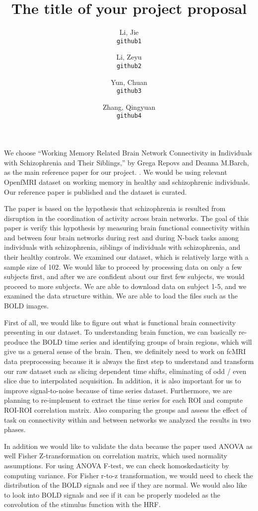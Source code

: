 \documentclass[11pt]{article}
\title{The title of your project proposal}
\author{
  Li, Jie\\
  \texttt{github1}
  \and
  Li, Zeyu\\
  \texttt{github2}
  \and
  Yun, Chuan\\
  \texttt{github3}
  \and
  Zhang, Qingyuan\\
  \texttt{github4}
}
\begin{document}
\maketitle

We choose ``Working Memory Related Brain Network Connectivity in Individuals
with Schizophrenia and Their Siblings,'' by Grega Repovs and Deanna M.Barch, as
the main reference paper for our project. \cite{lindquist2008statistical}. We
would be using relevant OpenfMRI dataset on working memory in healthy and
schizophrenic individuals. Our reference paper is published and the dataset is
curated.

The paper is based on the hypothesis that schizophrenia is resulted from
disruption in the coordination of activity across brain networks. The goal of
this paper is verify this hypothesis by measuring brain functional connectivity
within and between four brain networks during rest and during N-back tasks among
individuals with schizophrenia, siblings of individuals with schizophrenia, and
their healthy controls. We examined our dataset, which is relatively large with
a sample size of 102. We would like to proceed by processing data on only a few
subjects first, and after we are confident about our first few subjects, we
would proceed to more subjects. We are able to download data on subject 1-5, and
we examined the data structure within. We are able to load the files such as the
BOLD images. 
	
First of all, we would like to figure out what is functional brain connectivity
presenting in our dataset. To understanding brain function, we can basically
re-produce the BOLD time series and identifying groups of brain regions, which
will give us a general sense of the brain. Then, we definitely need to work on
fcMRI data preprocessing because it is always the first step to understand and
transform our raw dataset such as slicing dependent time shifts, eliminating of
odd / even slice due to interpolated acquisition. In addition, it is also
important for us to improve signal-to-noise because of time series dataset.
Furthermore, we are planning to re-implement to extract the time series for each
ROI and compute ROI-ROI correlation matrix. Also comparing the groups and assess
the effect of task on connectivity within and between networks we analyzed the
results in two phases.


In addition we would like to validate the data because the paper used ANOVA as
well Fisher Z-transformation on correlation matrix, which used normality
assumptions. For using ANOVA F-test, we can check homoskedasticity by computing
variance. For Fisher r-to-z transformation, we would need to check the
distribution of the BOLD signals and see if they are normal. We would also like
to look into BOLD signals and see if it can be properly modeled as the
convolution of the stimulus function with the HRF.
\end{document}
